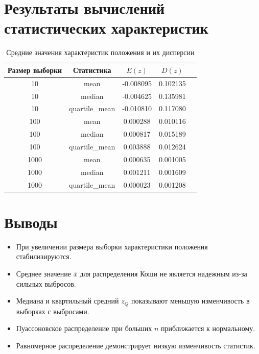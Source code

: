 \documentclass[a4paper]{article}
\begin{document}
    \section{Результаты вычислений статистических характеристик}\label{sec:---}
    \begin{table}[H]
        \centering
        \caption{Средние значения характеристик положения и их дисперсии}
        \begin{tabular}{|c|c|c|c|c|}
            \hline
            Размер выборки & Статистика     & $E(z)$    & $D(z)$   \\
            \hline
            10             & mean           & -0.008095 & 0.102135 \\
            10             & median         & -0.004625 & 0.135981 \\
            10             & quartile\_mean & -0.010810 & 0.117080 \\
            100            & mean           & 0.000288  & 0.010116 \\
            100            & median         & 0.000817  & 0.015189 \\
            100            & quartile\_mean & 0.003888  & 0.012624 \\
            1000           & mean           & 0.000635  & 0.001005 \\
            1000           & median         & 0.001211  & 0.001609 \\
            1000           & quartile\_mean & 0.000023  & 0.001208 \\
            \hline
        \end{tabular}
        \label{tab:table}
    \end{table}


    \section{Выводы}\label{sec:}
    \begin{itemize}
        \item При увеличении размера выборки характеристики положения стабилизируются.
        \item Среднее значение $\bar{x}$ для распределения Коши не является надежным из-за сильных выбросов.
        \item Медиана и квартильный средний $z_Q$ показывают меньшую изменчивость в выборках с выбросами.
        \item Пуассоновское распределение при больших $n$ приближается к нормальному.
        \item Равномерное распределение демонстрирует низкую изменчивость статистик.
    \end{itemize}
\end{document}
